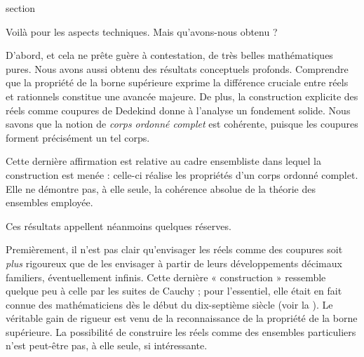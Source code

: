 \documentclass[11pt,a4paper,openany]{memoir}
\begin{document}
\endgroup


\begingroup
\expandafter\def\csname ol@sectioncs\endcsname{section}
\def\olfilename{reflections}



Voilà pour les aspects techniques. Mais qu'avons-nous obtenu ?

D'abord, et cela ne prête guère à contestation, de très belles
mathématiques pures. Nous avons aussi obtenu des résultats conceptuels
profonds. Comprendre que la propriété de la borne supérieure exprime
la différence cruciale entre réels et rationnels constitue une avancée
majeure. De plus, la construction explicite des réels comme coupures de
Dedekind donne à l'analyse un fondement solide. Nous savons que la
notion de \emph{corps ordonné complet} est cohérente, puisque les
coupures forment précisément un tel corps.
\begin{editorial}
Cette dernière affirmation est relative au cadre ensembliste dans
lequel la construction est menée : celle-ci réalise les propriétés
d'un corps ordonné complet. Elle ne démontre pas, à elle seule,
la cohérence absolue de la théorie des ensembles employée.
\end{editorial}

Ces résultats appellent néanmoins quelques réserves.

Premièrement, il n'est pas clair qu'envisager les réels comme des
coupures soit \emph{plus} rigoureux que de les envisager à partir de
leurs développements décimaux familiers, éventuellement infinis.
Cette dernière « construction » ressemble quelque peu à celle par
les suites de Cauchy ; pour l'essentiel, elle était en fait connue
des mathématiciens dès le début du dix-septième siècle
(voir la ). Le véritable gain de rigueur est venu de
la reconnaissance de la propriété de la borne supérieure.
La possibilité de construire les réels comme des ensembles particuliers
n'est peut-être pas, à elle seule, si intéressante.
\end{document}
